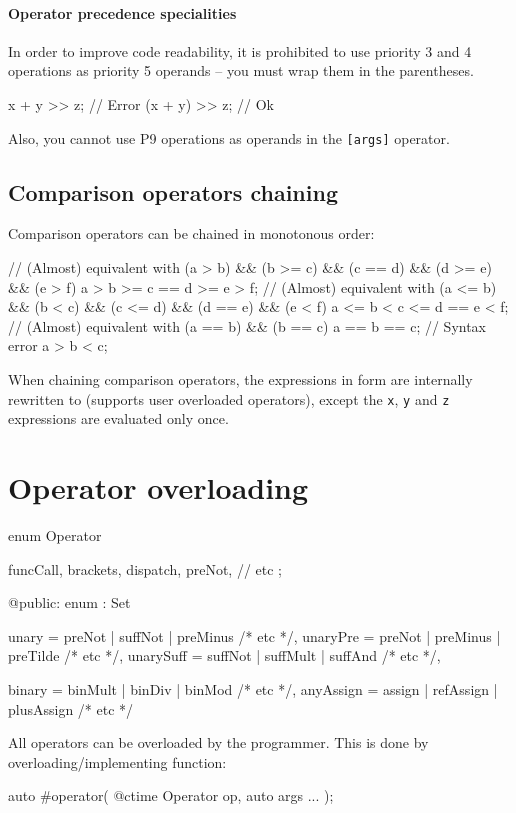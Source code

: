 \paragraph{Operator precedence specialities}
In order to improve code readability, it is prohibited to use priority 3 and 4 operations as priority 5 operands -- you must wrap them in the parentheses.
\begin{code}
x + y >> z; // Error
(x + y) >> z; // Ok
\end{code}

Also, you cannot use P9 operations as operands in the \verb|[args]| operator.

\subsection{Comparison operators chaining} Comparison operators can be chained in monotonous order:
\begin{code}
// (Almost) equivalent with (a > b) && (b >= c) && (c == d) && (d >= e) && (e > f)
a > b >= c == d >= e > f;
// (Almost) equivalent with (a <= b) && (b < c) && (c <= d) && (d == e) && (e < f)
a <= b < c <= d == e < f;
// (Almost) equivalent with (a == b) && (b == c)
a == b == c;
// Syntax error
a > b < c;
\end{code}

When chaining comparison operators, the expressions in form  are internally rewritten to  (supports user overloaded operators), except the \verb|x|, \verb|y| and \verb|z| expressions are evaluated only once.

\section{Operator overloading}

\begin{code}
enum Operator {
	funcCall,
	brackets,
	dispatch,
	preNot,
	// etc
	;
	
@public:
	enum : Set {
		unary = preNot | suffNot | preMinus /* etc */,
		unaryPre = preNot | preMinus | preTilde /* etc */,
		unarySuff = suffNot | suffMult | suffAnd /* etc */,
		
		binary = binMult | binDiv | binMod /* etc */,
		anyAssign = assign | refAssign | plusAssign /* etc */
	}	
}
\end{code}

All operators can be overloaded by the programmer. This is done by overloading/implementing function:
\begin{code}
auto #operator( @ctime Operator op, auto args ... );
\end{code}

